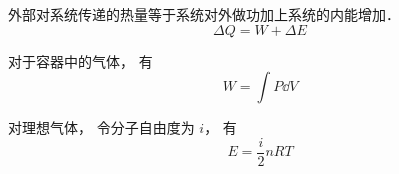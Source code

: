 
外部对系统传递的热量等于系统对外做功加上系统的内能增加．
\begin{equation}\label{Th1Law_eq1}
\Delta Q = W + \Delta E
\end{equation}

对于容器中的气体， 有
\begin{equation}
W = \int P \dd{V}
\end{equation}

对理想气体， 令分子自由度为 $i$， 有
\begin{equation}
E = \frac{i}{2}n RT
\end{equation}

